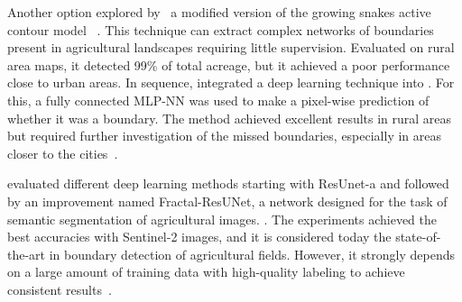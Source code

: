 \documentclass[12pt]{article}
\begin{document}
Another option  explored by~\citet{wagner2020}  a modified version of the growing snakes active contour model ~\cite{wagner2020}. This technique can extract complex networks of boundaries present in agricultural landscapes requiring little supervision. Evaluated on rural area maps, it detected 99\% of total acreage, but it achieved a poor performance close to urban areas. In sequence, \citet{wagner2020.2} integrated a deep learning technique into . For this, a fully connected MLP-NN was used to make a pixel-wise prediction of whether it was a boundary. The method achieved excellent results in rural areas but required further investigation of the missed boundaries, especially in areas closer to the cities~\cite{wagner2020.2,wagner2020}.


\citet{waldner2020} evaluated different deep learning methods starting with \mbox{ResUnet-a} and followed by an improvement named Fractal-ResUNet, a network designed for the task of semantic segmentation of agricultural images. . The experiments achieved the best accuracies with Sentinel-2 images, and it is considered today the state-of-the-art in boundary detection of agricultural fields. However, it strongly depends on a large amount of training data with high-quality labeling to achieve consistent results~\cite{waldner2020,waldner2021}.

\end{document}
